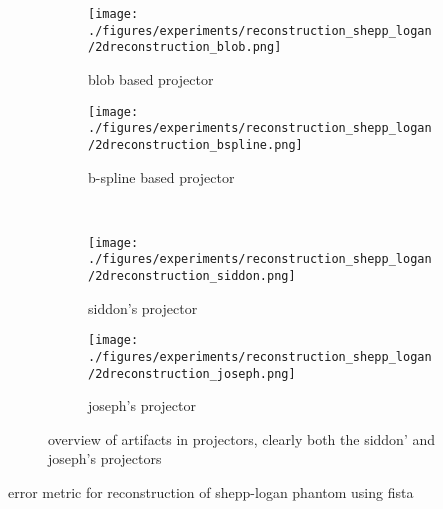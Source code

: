 \begin{figure}[h]
	\centering
	\begin{subfigure}[b]{0.45\textwidth}
		\centering
		\texttt{[image: ./figures/experiments/reconstruction\_shepp\_logan/2dreconstruction\_blob.png]}
		\caption{blob based projector}%
		\label{fig:reconstruction_shepp_logan_blob}
	\end{subfigure}
	\begin{subfigure}[b]{0.45\textwidth}
		\centering
		\texttt{[image: ./figures/experiments/reconstruction\_shepp\_logan/2dreconstruction\_bspline.png]}
		\caption{b-spline based projector}%
		\label{fig:reconstruction_shepp_logan_bspline}
	\end{subfigure} \\
	\begin{subfigure}[b]{0.45\textwidth}
		\centering
		\texttt{[image: ./figures/experiments/reconstruction\_shepp\_logan/2dreconstruction\_siddon.png]}
		\caption{siddon's projector}%
		\label{fig:reconstruction_shepp_logan_siddon}
	\end{subfigure}
	\begin{subfigure}[b]{0.45\textwidth}
		\centering
		\texttt{[image: ./figures/experiments/reconstruction\_shepp\_logan/2dreconstruction\_joseph.png]}
		\caption{joseph's projector}%
		\label{fig:reconstruction_shepp_logan_joseph}
	\end{subfigure}
	\caption{overview of artifacts in projectors, clearly both the siddon' and joseph's
		projectors}%
	\label{fig:reconstruction_shepp_logan}
\end{figure}

\begin{table}%
	\centering
	\caption{error metric for reconstruction of shepp-logan phantom using fista}%
	\label{tab:error_metric_shepp_logan}
\end{table}

